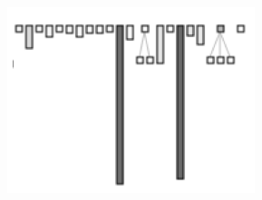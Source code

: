 \documentclass[11pt,a4paper]{article}
\begin{document}
\begin{figure}
\includegraphics[width=\textwidth]{arch_5}
\end{figure}
\end{document}

